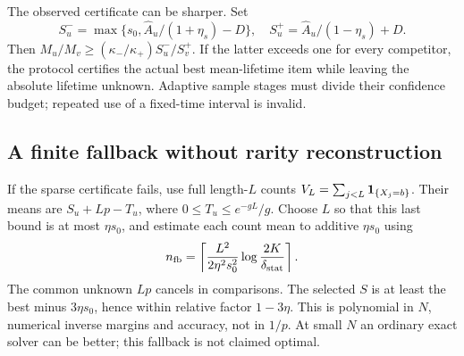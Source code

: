 The observed certificate can be sharper. Set
\begin{equation}
 S_u^- =\max\{s_0,\widehat A_u/(1+\eta_s)-D\},\quad
 S_u^+ =\widehat A_u/(1-\eta_s)+D.
 \label{eq:observedinterval}
\end{equation}
Then $M_u/M_v\ge(\kappa_-/\kappa_+)S_u^-/S_v^+$. If the latter exceeds one for every competitor, the protocol certifies the actual best mean-lifetime item while leaving the absolute lifetime unknown. Adaptive sample stages must divide their confidence budget; repeated use of a fixed-time interval is invalid.

\subsection{A finite fallback without rarity reconstruction}
If the sparse certificate fails, use full length-$L$ counts $V_L=\sum_{j<L}\mathbf 1_{\{X_j=b\}}$. Their means are $S_u+Lp-T_u$, where $0\le T_u\le e^{-gL}/g$. Choose $L$ so that this last bound is at most $\eta s_0$, and estimate each count mean to additive $\eta s_0$ using
\[
 n_{\rm fb}=\left\lceil\frac{L^2}{2\eta^2s_0^2}\log\frac{2K}{\delta_{\rm stat}}\right\rceil.
\]
The common unknown $Lp$ cancels in comparisons. The selected $S$ is at least the best minus $3\eta s_0$, hence within relative factor $1-3\eta$. This is polynomial in $N$, numerical inverse margins and accuracy, not in $1/p$. At small $N$ an ordinary exact solver can be better; this fallback is not claimed optimal.
